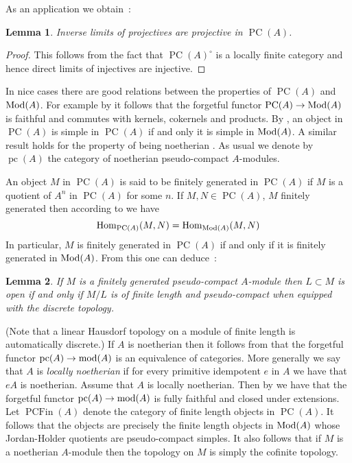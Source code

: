 \documentclass{amsproc}
\def\Mod{\mathop{\text{Mod}}}
\def\mod{\mathop{\text{mod}}}
\def\Hom{\operatorname {Hom}}
\def\r{\rightarrow}
\let\oldtext\text
\def\text#1{\oldtext{\upshape #1}}
\DeclareMathOperator{\PC}{PC}
\DeclareMathOperator{\pc}{pc}
\DeclareMathOperator{\PCFin}{PCFin}
\newtheorem{lemma}{Lemma}[section]
\theoremstyle{definition}
\theoremstyle{remark}
\numberwithin{equation}{section}
\numberwithin{table}{section}
\numberwithin{figure}{section}
\begin{document}
As an application we obtain~:
\begin{lemma}
\label{ref:4.1a}
Inverse limits of projectives are projective in $\PC(A)$.
\end{lemma}
\begin{proof} This follows from the fact that $\PC(A)^\circ$ is a
  locally finite category and hence direct limits of injectives are
  injective.
\end{proof}
In nice cases there are good relations between the properties of
$\PC(A)$ and $\Mod(A)$. For example 
by \cite{Gabriel} it
follows 
that the forgetful functor $\PC(A)\r \Mod(A)$ is faithful and commutes
with kernels, cokernels and products. 
By \cite[Lemma 3.4]{VdBVG}, an object in $\PC(A)$ is simple in
$\PC(A)$ if and only it is  simple in $\Mod(A)$. A similar result holds
for the property of being noetherian \cite[Cor 3.10]{VdBVG}. 
As usual we denote by $\pc(A)$ the category of
noetherian pseudo-compact $A$-modules.

An object $M$ in $\PC(A)$ is said to be finitely generated in $\PC(A)$ if 
 $M$ is a quotient of $A^n$ in $\PC(A)$ for some $n$. If
$M,N\in\PC(A)$, $M$ finitely generated then according to \cite[Prop.\
3.5]{VdBVG} we have
\[
\Hom_{\PC(A)}(M,N)=\Hom_{\Mod(A)}(M,N)
\]
In particular, $M$ is finitely generated in $\PC(A)$ if and only if it is
finitely generated in $\Mod(A)$. From
this one can deduce~:
\begin{lemma}
\label{ref:4.2a}
\cite[Cor.\ 3.8]{VdBVG} If $M$ is a finitely generated pseudo-compact
$A$-module then $L\subset M$ is open if and only if $M/L$ is of finite
length and pseudo-compact when equipped with the discrete topology.
\end{lemma}
(Note that a linear Hausdorf topology on a module of finite length is
automatically discrete.)  If $A$ is noetherian then it follows from
\cite[Prop.\ 3.19]{VdBVG} that the forgetful functor $\pc(A)\r
\mod(A)$ is an equivalence of categories. More generally we say that
$A$ is \emph{locally noetherian} if for every primitive idempotent $e$
in $A$ we have that $eA$ is noetherian. Assume that $A$ is locally
noetherian.  Then by \cite[Cor. 3.15]{VdBVG} we have that the
forgetful functor $\pc(A)\r\mod(A)$ is fully faithful and closed under
extensions.  Let $\PCFin(A)$ denote the category of finite length
objects in $\PC(A)$.  It follows that the objects are precisely the
finite length objects in $\Mod(A)$ whose Jordan-Holder quotients are
pseudo-compact simples.  It also follows that if $M$ is a noetherian
$A$-module then the topology on $M$ is simply the cofinite topology.
\end{document}
